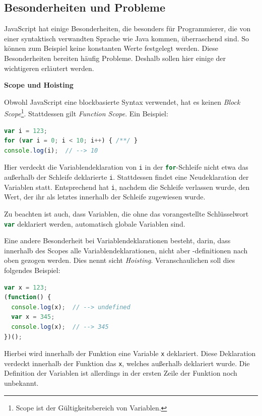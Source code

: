 \documentclass[a4paper, 12pt, hidelinks, listof=totoc, listoftables=totoc, bibliography=totoc]{scrreprt}
\newcommand{\js}[1]{\lstinline[language=JavaScript, style=inline]|#1|}
\newcommand{\MyMiniSec}[1]{\rmfamily\fontsize{12}{15}\selectfont
	\vspace{7pt}\textbf{#1} %
}
\begin{document}
\subsection{Besonderheiten und Probleme}

JavaScript hat einige Besonderheiten, die besonders für Programmierer, die von einer syntaktisch verwandten Sprache wie Java kommen, überraschend sind. So können zum Beispiel keine konstanten Werte festgelegt werden. Diese Besonderheiten bereiten häufig Probleme. Deshalb sollen hier einige der wichtigeren erläutert werden.


\MyMiniSec{Scope und Hoisting}

Obwohl JavaScript eine blockbasierte Syntax verwendet, hat es keinen \emph{Block Scope}\footnote{Scope ist der Gültigkeitsbereich von Variablen.}. Stattdessen gilt \emph{Function Scope}. Ein Beispiel:

\begin{lstlisting}[language=JavaScript, style=snippet]
var i = 123;
for (var i = 0; i < 10; i++) { /**/ }
console.log(i);  // --> 10
\end{lstlisting}

Hier verdeckt die Variablendeklaration von \js{i} in der \js{for}-Schleife nicht etwa das außerhalb der Schleife deklarierte \js{i}. Stattdessen findet eine Neudeklaration der Variablen statt. Entsprechend hat \js{i}, nachdem die Schleife verlassen wurde, den Wert, der ihr als letztes innerhalb der Schleife zugewiesen wurde.

Zu beachten ist auch, dass Variablen, die ohne das vorangestellte Schlüsselwort \js{var} deklariert werden, automatisch globale Variablen sind.

Eine andere Besonderheit bei Variablendeklarationen besteht, darin, dass innerhalb des Scopes alle Variablendeklarationen, nicht aber -definitionen nach oben gezogen werden. Dies nennt sicht \emph{Hoisting}. Veranschaulichen soll dies folgendes Beispiel:

\begin{lstlisting}[language=JavaScript, style=snippet]
var x = 123;
(function() {
  console.log(x);  // --> undefined
  var x = 345;
  console.log(x);  // --> 345
})();
\end{lstlisting}

Hierbei wird innerhalb der Funktion eine Variable \js{x} deklariert. Diese Deklaration verdeckt 
innerhalb der Funktion das \js{x}, welches außerhalb deklariert wurde. Die Definition der Variablen ist allerdings in der ersten Zeile der Funktion noch unbekannt.
\end{document}
